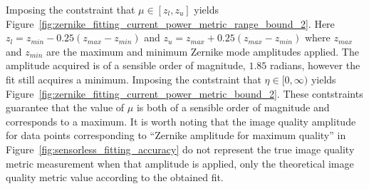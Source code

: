Imposing the contstraint that $\mu \in [z_{l}, z_{u}]$ yields 
Figure~\ref{fig:zernike_fitting_current_power_metric_range_bound_2}. Here 
$z_{l} = z_{min} - 0.25(z_{max}-z_{min})$ and $z_{u} = z_{max} + 
0.25(z_{max}-z_{min})$ where $z_{max}$ and $z_{min}$ are the maximum and 
minimum Zernike mode amplitudes applied. The amplitude acquired is of a 
sensible order of magnitude, $1.85$ radians, however the fit still acquires 
a minimum. Imposing the contstraint that $\eta \in [0, \infty)$ 
yields Figure~\ref{fig:zernike_fitting_current_power_metric_bound_2}. These 
contstraints guarantee that the value of $\mu$ is both of a sensible 
order of magnitude and corresponds to a maximum. It is worth noting that 
the image quality amplitude for data points corresponding to ``Zernike 
amplitude for maximum quality'' in 
Figure~\ref{fig:sensorless_fitting_accuracy} do not represent the true 
image quality metric measurement when that amplitude is applied, only the 
theoretical image quality metric value according to the obtained fit. 

